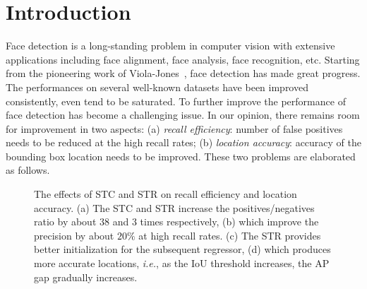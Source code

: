 \documentclass[letterpaper]{article} \usepackage{aaai19m}  \usepackage{times}  \usepackage{helvet}  \usepackage{courier}  \usepackage{url}  \usepackage{graphicx}  \usepackage{subfigure}
\def\ie{{\em i.e.}}
\begin{document}
\section{Introduction}
Face detection is a long-standing problem in computer
vision with extensive applications including face alignment, face analysis, face recognition, etc. Starting from the pioneering work of Viola-Jones~\cite{DBLP:journals/ijcv/ViolaJ04}, face detection has made great progress. The performances on several well-known datasets have been improved consistently, even tend to be saturated. To further improve the performance of face detection has become a challenging issue. In our opinion, there remains room for improvement in two aspects: (a) \emph{recall efficiency}: number of false positives needs to be reduced at the high recall rates; (b) \emph{location accuracy}: accuracy of the bounding box location needs to be improved. These two problems are elaborated as follows.


\begin{figure}[t]
\centering
{}
\vspace{-3.0mm}
\caption{The effects of STC and STR on recall efficiency and location accuracy. (a) The STC and STR increase the positives/negatives ratio by about $38$ and $3$ times respectively, (b) which improve the precision by about $20\%$ at high recall rates. (c) The STR provides better initialization for the subsequent regressor, (d) which produces more accurate locations, \ie, as the IoU threshold increases, the AP gap gradually increases.}
\vspace{-4.0mm}
\label{fig:effect-stc-str} \end{figure}
\end{document}
